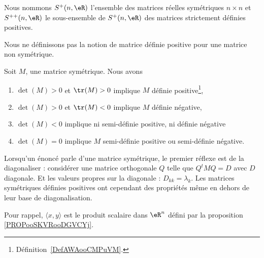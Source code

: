 \begin{normaltext}      \label{NORMooAJLHooQhwpvr}
    Nous nommons \( S^+(n,\eR)\) l'ensemble des matrices réelles symétriques \( n\times n\) et \( S^{++}(n,\eR)\) le sous-ensemble de \( S^+(n,\eR)\) des matrices strictement définies positives.
\end{normaltext}

\begin{remark}
    Nous ne définissons pas la notion de matrice définie positive pour une matrice non symétrique.
\end{remark}

\begin{proposition}     \label{PropcnJyXZ}
    Soit \( M\), une matrice symétrique. Nous avons
    \begin{enumerate}
        \item       \label{ITEMooTJVQooYmRkas}
            \( \det(M)>0\) et \( \tr(M)>0\) implique \( M\) définie positive\footnote{Définition~\ref{DefAWAooCMPuVM}.},
        \item
            \( \det(M)>0\) et \( \tr(M)<0\) implique \( M\) définie négative,
        \item       \label{ItemluuFPN}
            \( \det(M)<0\) implique ni semi-définie positive, ni définie négative
        \item
            \( \det(M)=0\) implique \( M\) semi-définie positive ou semi-définie négative.
    \end{enumerate}
\end{proposition}

Lorsqu'un énoncé parle d'une matrice symétrique, le premier réflexe est de la diagonaliser : considérer une matrice orthogonale \( Q\) telle que \( Q^tMQ=D\) avec \( D\) diagonale. Et les valeurs propres sur la diagonale : \( D_{kk}=\lambda_k\). Les matrices symétriques définies positives ont cependant des propriétés même en dehors de leur base de diagonalisation.

Pour rappel, \( \langle x, y\rangle \) est le produit scalaire dans \( \eR^n\) défini par la proposition \ref{PROPooSKVRooDGVCYj}.

